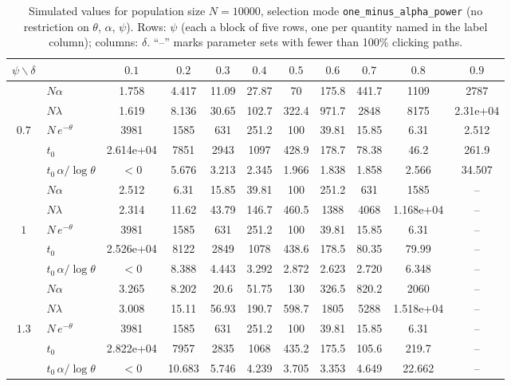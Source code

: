 \documentclass[10pt]{article}
\begin{document}
\begin{table}[t]
\centering
\caption{Simulated values for population size $N=10000$, selection mode
\texttt{one_minus_alpha_power} (no restriction on $\theta$, $\alpha$, $\psi$).
Rows: $\psi$ (each a block of five rows, one per quantity named in the label
column); columns: $\delta$. ``--'' marks parameter sets with fewer than
100\% clicking paths.}
\setlength{\tabcolsep}{4pt}
\begin{adjustbox}{max width=\textwidth, max totalheight=0.9\textheight, center}
\scriptsize
\begin{tabular}{c lccccccccc}
\toprule
$\psi \backslash \delta$ &  & $0.1$ & $0.2$ & $0.3$ & $0.4$ & $0.5$ & $0.6$ & $0.7$ & $0.8$ & $0.9$ \\
\midrule
 & $N\alpha$ & 1.758 & 4.417 & 11.09 & 27.87 & 70 & 175.8 & 441.7 & 1109 & 2787 \\
 & $N\lambda$ & 1.619 & 8.136 & 30.65 & 102.7 & 322.4 & 971.7 & 2848 & 8175 & 2.31e+04 \\
$0.7$ & $N\,e^{-\theta}$ & 3981 & 1585 & 631 & 251.2 & 100 & 39.81 & 15.85 & 6.31 & 2.512 \\
 & $t_0$ & 2.614e+04 & 7851 & 2943 & 1097 & 428.9 & 178.7 & 78.38 & 46.2 & 261.9 \\
 & $t_0\,\alpha/\log\theta$ & $<0$ & 5.676 & 3.213 & 2.345 & 1.966 & 1.838 & 1.858 & 2.566 & 34.507 \\
\midrule
 & $N\alpha$ & 2.512 & 6.31 & 15.85 & 39.81 & 100 & 251.2 & 631 & 1585 & -- \\
 & $N\lambda$ & 2.314 & 11.62 & 43.79 & 146.7 & 460.5 & 1388 & 4068 & 1.168e+04 & -- \\
$1$ & $N\,e^{-\theta}$ & 3981 & 1585 & 631 & 251.2 & 100 & 39.81 & 15.85 & 6.31 & -- \\
 & $t_0$ & 2.526e+04 & 8122 & 2849 & 1078 & 438.6 & 178.5 & 80.35 & 79.99 & -- \\
 & $t_0\,\alpha/\log\theta$ & $<0$ & 8.388 & 4.443 & 3.292 & 2.872 & 2.623 & 2.720 & 6.348 & -- \\
\midrule
 & $N\alpha$ & 3.265 & 8.202 & 20.6 & 51.75 & 130 & 326.5 & 820.2 & 2060 & -- \\
 & $N\lambda$ & 3.008 & 15.11 & 56.93 & 190.7 & 598.7 & 1805 & 5288 & 1.518e+04 & -- \\
$1.3$ & $N\,e^{-\theta}$ & 3981 & 1585 & 631 & 251.2 & 100 & 39.81 & 15.85 & 6.31 & -- \\
 & $t_0$ & 2.822e+04 & 7957 & 2835 & 1068 & 435.2 & 175.5 & 105.6 & 219.7 & -- \\
 & $t_0\,\alpha/\log\theta$ & $<0$ & 10.683 & 5.746 & 4.239 & 3.705 & 3.353 & 4.649 & 22.662 & -- \\

\end{tabular}
\end{adjustbox}
\end{table}
\end{document}
